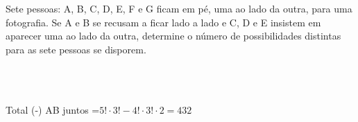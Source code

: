 \begin{ex}
 Sete pessoas: A, B, C, D, E, F e G ficam em pé, uma ao lado da outra, para uma fotografia. Se A e B se recusam a ficar lado a lado e C,  D e E insistem em aparecer uma ao lado da outra,  determine o número de possibilidades distintas para as sete pessoas  se disporem.
   \begin{sol}
      \phantom{A}  \\
      \\
  Total (-) AB juntos =$5!\cdot3!-4!\cdot3!\cdot2=432$
   \end{sol}
\end{ex}